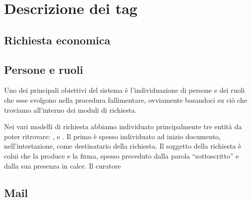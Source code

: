 
\section{Descrizione dei tag}

\subsection{Richiesta economica}

\subsection{Persone e ruoli}
Uno dei principali obiettivi del sistema è l'individuazione di persone e dei ruoli che esse svolgono nella procedura fallimentare, ovviamente basandoci su ciò che troviamo all'interno dei moduli di richiesta.

Nei vari modelli di richiesta abbiamo individuato principalmente tre entità da poter ritrovare: ,  e .
Il primo è spesso individuato ad inizio documento, nell'intestazione, come destinatario della richiesta.
Il soggetto della richiesta è colui che la produce e la firma, spesso preceduto dalla parola ``sottoscritto'' e dalla sua presenza in calce.
Il curatore

\subsection{}

\subsection{Mail}
